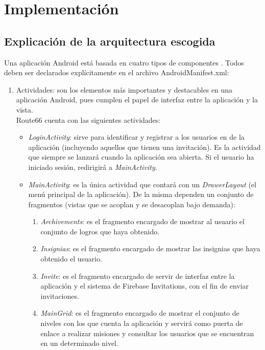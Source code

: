 \documentclass[twoside]{report}
\begin{document}
\section{Implementación}

\subsection{Explicación de la arquitectura escogida}

Una aplicación Android está basada en cuatro tipos de componentes \cite{androidfund} \cite{androidpacktpub}. Todos deben ser declarados explícitamente en el archivo AndroidManifest.xml:

\begin{enumerate}
\item Actividades: son los elementos más importantes y destacables en una aplicación Android, pues cumplen el papel de interfaz entre la aplicación y la vista.\\
Route66 cuenta con las siguientes actividades:

	\begin{itemize}
	\item \textit{LoginActivity}: sirve para identificar y registrar a los usuarios en de la aplicación (incluyendo aquellos que tienen una invitación). Es la actividad que siempre se lanzará cuando la aplicación sea abierta. Si el usuario ha iniciado sesión, redirigirá  a \textit{MainActivity}.
	
	\item \textit{MainActivity}: es la única actividad que contará con un \textit{DrawerLayout} (el menú principal de la aplicación). De la misma dependen un conjunto de fragmentos (vistas que se acoplan y se desacoplan bajo demanda):
	
		\begin{enumerate}
			\item \textit{Archivements}: es el fragmento encargado de mostrar al usuario el conjunto de logros que haya obtenido.
			
			\item \textit{Insignias}: es el fragmento encargado de mostrar las insignias que haya obtenido el usuario.
			
			\item \textit{Invite}: es el fragmento encargado de servir de interfaz entre la aplicación y el sistema de Firebase Invitations, con el fin de enviar invitaciones.
			
			\item \textit{MainGrid}: es el fragmento encargado de mostrar el conjunto de niveles con los que cuenta la aplicación y servirá como puerta de enlace a realizar misiones y consultar los usuarios que se encuentran en un determinado nivel.
			

\end{enumerate}
\end{itemize}
\end{enumerate}
\end{document}
